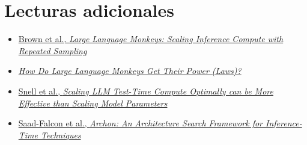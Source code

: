 \section{Lecturas adicionales}

\begin{itemize}
    \item \href{https://arxiv.org/abs/2407.21787}{Brown et al., \emph{Large Language Monkeys: Scaling Inference Compute with Repeated Sampling}}
    \item \href{https://arxiv.org/abs/2502.17578}{\emph{How Do Large Language Monkeys Get Their Power (Laws)?}}
    \item \href{https://arxiv.org/abs/2408.03314}{Snell et al., \emph{Scaling LLM Test-Time Compute Optimally can be More Effective than Scaling Model Parameters}}
    \item \href{https://arxiv.org/abs/2409.15254}{Saad-Falcon et al., \emph{Archon: An Architecture Search Framework for Inference-Time Techniques}}
\end{itemize}

